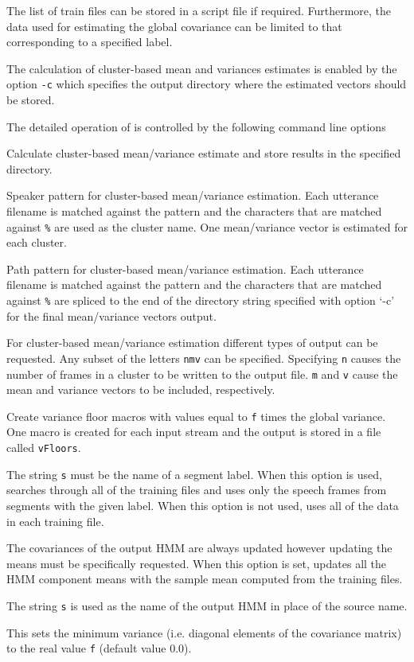 The list of train files can be stored in a script file if required.
Furthermore, the data used for estimating the global
covariance can be limited to that corresponding to a specified label.


The calculation of cluster-based mean and variances estimates is
enabled by the option \texttt{-c} which specifies the output directory
where the estimated vectors should be stored.

The detailed operation of  is controlled by the following
command line options
\begin{optlist}
   Calculate cluster-based mean/variance estimate and
  store results in the specified directory.

   Speaker pattern for cluster-based mean/variance
  estimation. Each utterance filename is matched against the pattern
  and the characters that are matched against \verb|%| are used as the
  cluster name. One mean/variance vector is estimated for each
  cluster.

   Path pattern for cluster-based mean/variance
  estimation. Each utterance filename is matched against the pattern
  and the characters that are matched against \verb|%| are spliced to
  the end of the directory string specified with option `-c' for the final
  mean/variance vectors output. 
  
   For cluster-based mean/variance estimation different
  types of output can be requested. Any subset of the letters
  \texttt{nmv} can be specified. Specifying \texttt{n} causes the
  number of frames in a cluster to be written to the output file.
  \texttt{m} and \texttt{v} cause the mean and variance vectors to be
  included, respectively.

   Create variance floor macros with values equal to 
     \texttt{f} times the global variance.  One macro is created for
     each input stream and the output is stored in a file 
     called \texttt{vFloors}. 

   The string {\tt s} must be the name of a
      segment label.  When this option is used,  searches
      through all of the training files and uses only the speech
      frames from segments with the given label.  When this option is not 
      used,  uses
      all of the data in each training file.

   The covariances of the output HMM are always updated
    however updating the means must be specifically requested. When 
    this option is set,  updates all the HMM component 
    means with the sample mean computed from the training files. 

    The string {\tt s} is used as the name of the output
      HMM in place of the source name.

    This sets the minimum variance (i.e. diagonal elements of
      the covariance matrix) to the real value {\tt f} (default value
      0.0).

\stdoptB
\stdoptF
\stdoptG
\stdoptH
\stdoptI
\stdoptL
\stdoptM
\stdoptX

\end{optlist}

